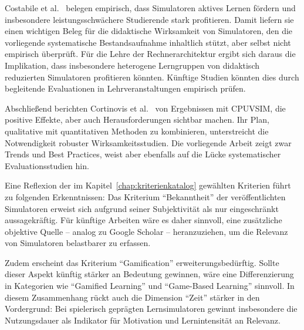 Costabile et al.~\cite{costabile_using_2025} belegen empirisch, dass Simulatoren aktives Lernen fördern und insbesondere leistungsschwächere Studierende stark profitieren. Damit liefern sie einen wichtigen Beleg für die didaktische Wirksamkeit von Simulatoren, den die vorliegende systematische Bestandsaufnahme inhaltlich stützt, aber selbst nicht empirisch überprüft. Für die Lehre der Rechnerarchitektur ergibt sich daraus die Implikation, dass insbesondere heterogene Lerngruppen von didaktisch reduzierten Simulatoren profitieren könnten. Künftige Studien könnten dies durch begleitende Evaluationen in Lehrveranstaltungen empirisch prüfen.

Abschließend berichten Cortinovis et al.~\cite{cortinovis_further_2024} von Ergebnissen mit CPUVSIM, die positive Effekte, aber auch Herausforderungen sichtbar machen. Ihr Plan, qualitative mit quantitativen Methoden zu kombinieren, unterstreicht die Notwendigkeit robuster Wirksamkeitsstudien. Die vorliegende Arbeit zeigt zwar Trends und Best Practices, weist aber ebenfalls auf die Lücke systematischer Evaluationsstudien hin.

Eine Reflexion der im Kapitel~\ref{chap:kriterienkatalog} gewählten Kriterien führt zu folgenden Erkenntnissen: Das Kriterium \enquote{Bekanntheit} der veröffentlichten Simulatoren erweist sich aufgrund seiner Subjektivität als nur eingeschränkt aussagekräftig. Für künftige Arbeiten wäre es daher sinnvoll, eine zusätzliche objektive Quelle – analog zu Google Scholar – heranzuziehen, um die Relevanz von Simulatoren belastbarer zu erfassen. 

Zudem erscheint das Kriterium \enquote{Gamification} erweiterungsbedürftig. Sollte dieser Aspekt künftig stärker an Bedeutung gewinnen, wäre eine Differenzierung in Kategorien wie \enquote{Gamified Learning} und \enquote{Game-Based Learning} sinnvoll. In diesem Zusammenhang rückt auch die Dimension \enquote{Zeit} stärker in den Vordergrund: Bei spielerisch geprägten Lernsimulatoren gewinnt insbesondere die Nutzungsdauer als Indikator für Motivation und Lernintensität an Relevanz.
